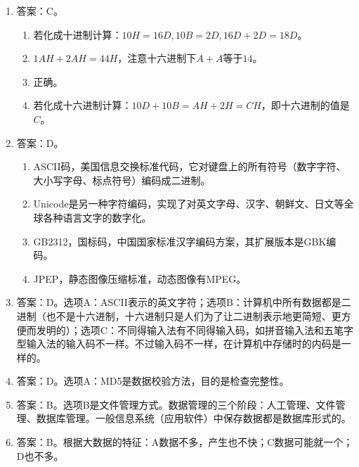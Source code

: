 \begin{enumerate}
\item 答案：C。
	\begin{enumerate}[label=\Alph*.]
	\item 若化成十进制计算：$10H=16D, 10B = 2D, 16D+2D=18D$。
	\item $1AH + 2AH = 44H$，注意十六进制下$A + A$等于$14$。
	\item 正确。
	\item 若化成十六进制计算：$10D + 10B = AH + 2H = CH$，即十六进制的值是$C$。
	\end{enumerate}

\item 答案：D。
	\begin{enumerate}[label=\Alph*.]
	\item ASCII码，美国信息交换标准代码，它对键盘上的所有符号（数字字符、大小写字母、标点符号）编码成二进制。
	\item Unicode是另一种字符编码，实现了对英文字母、汉字、朝鲜文、日文等全球各种语言文字的数字化。
	\item GB2312，国标码，中国国家标准汉字编码方案，其扩展版本是GBK编码。
	\item JPEP，静态图像压缩标准，动态图像有MPEG。
	\end{enumerate}

\item 答案：D。选项A：ASCII表示的英文字符；选项B：计算机中所有数据都是二进制（也不是十六进制，十六进制只是人们为了让二进制表示地更简短、更方便而发明的）；选项C：不同得输入法有不同得输入码，如拼音输入法和五笔字型输入法的输入码不一样。不过输入码不一样，在计算机中存储时的内码是一样的。

\item 答案：D。选项A：MD5是数据校验方法，目的是检查完整性。

\item 答案：B。选项B是文件管理方式。数据管理的三个阶段：人工管理、文件管理、数据库管理。一般信息系统（应用软件）中保存数据都是数据库形式的。

\item 答案：B。根据大数据的特征：A数据不多，产生也不快；C数据可能就一个；D也不多。


\end{enumerate}
